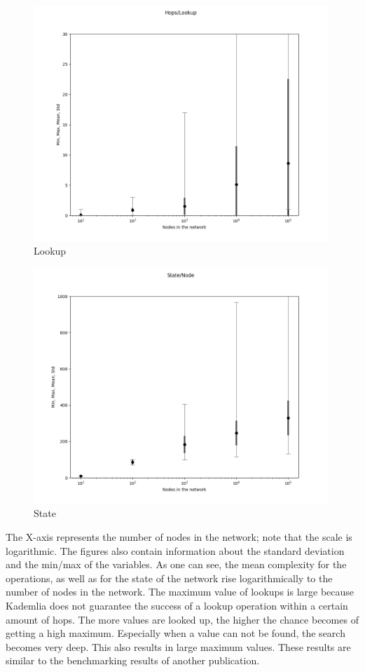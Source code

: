 \documentclass[a4paper, 12pt]{article} %
\begin{document}
\begin{figure}[ht]
    \caption{Lookup}
    \centering
    \includegraphics[width=0.99\textwidth]{images/lookup_figure.png}
\end{figure}

\begin{figure}[ht]
    \caption{State}
    \centering
    \includegraphics[width=0.99\textwidth]{images/state_figure.png}
\end{figure}

The X-axis represents the number of nodes in the network; note that the scale is logarithmic. The figures also contain information about the standard deviation and the min/max of the variables. As one can see, the mean complexity for the operations, as well as for the state of the network rise logarithmically to the number of nodes in the network. The maximum value of lookups is large because Kademlia does not guarantee the success of a lookup operation within a certain amount of hops. The more values are looked up, the higher the chance becomes of getting a high maximum. Especially when a value can not be found, the search becomes very deep. This also results in large maximum values. These results are similar to the benchmarking results of another publication\cite{Kovacevic2008}.
\end{document}
